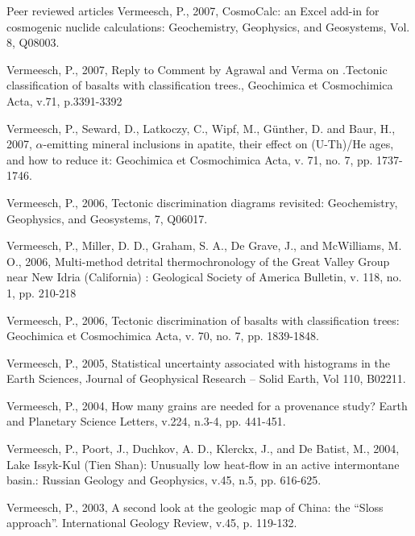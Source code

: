\documentclass{resume}
\begin{document}
\begin{category}{Peer reviewed articles}
\citemnobullet Vermeesch, P., 2007, CosmoCalc: an Excel add-in for
cosmogenic nuclide calculations: Geochemistry, Geophysics, and
Geosystems, Vol. 8, Q08003.

\citemnobullet Vermeesch, P., 2007, Reply to Comment by Agrawal and
Verma on .Tectonic classification of basalts with classification
trees., Geochimica et Cosmochimica Acta, v.71, p.3391-3392

\citemnobullet Vermeesch, P., Seward, D., Latkoczy, C., Wipf, M.,
G\"{u}nther, D. and Baur, H., 2007, $\alpha$-emitting mineral
inclusions in apatite, their effect on (U-Th)/He ages, and how to
reduce it: Geochimica et Cosmochimica Acta, v. 71, no. 7,
pp. 1737-1746.

\citemnobullet Vermeesch, P., 2006, Tectonic discrimination diagrams
revisited: Geochemistry, Geophysics, and Geosystems, 7, Q06017.

\citemnobullet Vermeesch, P., Miller, D. D., Graham, S. A., De Grave,
J., and McWilliams, M. O., 2006, Multi-method detrital
thermochronology of the Great Valley Group near New Idria (California)
: Geological Society of America Bulletin, v. 118, no. 1, pp. 210-218

\citemnobullet Vermeesch, P., 2006, Tectonic discrimination of basalts
with classification trees: Geochimica et Cosmochimica Acta, v. 70,
no. 7, pp. 1839-1848.

\citemnobullet Vermeesch, P., 2005, Statistical uncertainty associated with histograms
in the Earth Sciences, Journal of Geophysical Research -- Solid Earth, Vol 110, B02211.

\citemnobullet Vermeesch,  P., 2004,  How many  grains  are needed  for a  provenance
study? Earth and Planetary Science Letters, v.224, n.3-4, pp. 441-451.

\citemnobullet Vermeesch, P., Poort, J., Duchkov,  A. D., Klerckx, J., and De Batist,
M., 2004,  Lake Issyk-Kul (Tien  Shan): Unusually low heat-flow  in an
active intermontane basin.: Russian Geology and Geophysics, v.45, n.5,
pp. 616-625.

\citemnobullet Vermeesch, P., 2003,  A second look at the geologic  map of China: the
``Sloss approach''. International Geology Review, v.45, p. 119-132.
\end{category}
\end{document}
